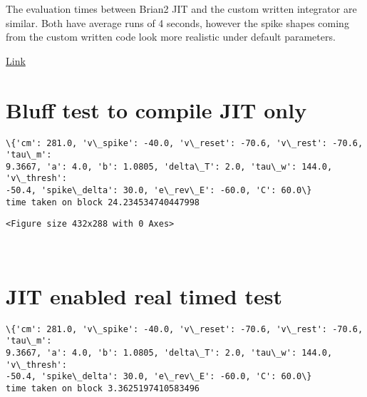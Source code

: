 The evaluation times between Brian2 JIT and the custom written
integrator are similar. Both have average runs of 4 seconds, however the
spike shapes coming from the custom written code look more realistic
under default parameters.

\href{https://github.com/russelljjarvis/neuronunit/blob/master/neuronunit/unit_test/druckman_tests.ipynb}{Link}

    \hypertarget{bluff-test-to-compile-jit-only}{%
\section{Bluff test to compile JIT
only}\label{bluff-test-to-compile-jit-only}}

    \begin{Verbatim}[commandchars=\\\{\}]
\{'cm': 281.0, 'v\_spike': -40.0, 'v\_reset': -70.6, 'v\_rest': -70.6, 'tau\_m':
9.3667, 'a': 4.0, 'b': 1.0805, 'delta\_T': 2.0, 'tau\_w': 144.0, 'v\_thresh':
-50.4, 'spike\_delta': 30.0, 'e\_rev\_E': -60.0, 'C': 60.0\}
time taken on block 24.234534740447998
    \end{Verbatim}

    
    \begin{verbatim}
<Figure size 432x288 with 0 Axes>
    \end{verbatim}

    
    \begin{center}
    \end{center}
    { \hspace*{\fill} \\}
    
    \hypertarget{jit-enabled-real-timed-test}{%
\section{JIT enabled real timed
test}\label{jit-enabled-real-timed-test}}

    \begin{Verbatim}[commandchars=\\\{\}]
\{'cm': 281.0, 'v\_spike': -40.0, 'v\_reset': -70.6, 'v\_rest': -70.6, 'tau\_m':
9.3667, 'a': 4.0, 'b': 1.0805, 'delta\_T': 2.0, 'tau\_w': 144.0, 'v\_thresh':
-50.4, 'spike\_delta': 30.0, 'e\_rev\_E': -60.0, 'C': 60.0\}
time taken on block 3.3625197410583496
    \end{Verbatim}

